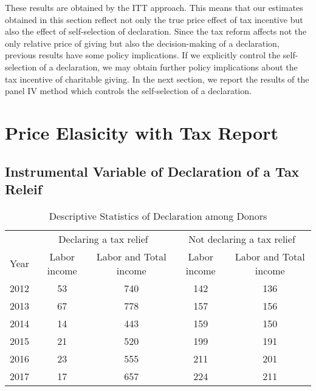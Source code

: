 \documentclass[
  11pt,
  a4paper,
]{article}
\begin{document}
These results are obtained by the ITT approach.
This means that our estimates obtained in this section reflect not only
the true price effect of tax incentive but also the effect of self-selection of declaration.
Since the tax reform affects not the only relative price of giving but also the decision-making of a declaration,
previous results have some policy implications.
If we explicitly control the self-selection of a declaration,
we may obtain further policy implications about the tax incentive of charitable giving.
In the next section, we report the results of the panel IV method which controls the self-selection of a declaration.

\hypertarget{price-elasicity-with-tax-report}{%
\section{Price Elasicity with Tax Report}\label{price-elasicity-with-tax-report}}

\hypertarget{instrumental-variable-of-declaration-of-a-tax-releif}{%
\subsection{Instrumental Variable of Declaration of a Tax Releif}\label{instrumental-variable-of-declaration-of-a-tax-releif}}

\begin{table}

\caption{\label{tab:SummaryDeduct}Descriptive Statistics of Declaration among Donors}
\centering
\begin{tabular}[t]{lcccc}
\toprule
\multicolumn{1}{c}{} & \multicolumn{2}{c}{Declaring a tax relief} & \multicolumn{2}{c}{Not declaring a tax relief} \\
\cmidrule(l{3pt}r{3pt}){2-3} \cmidrule(l{3pt}r{3pt}){4-5}
Year & Labor income & Labor and Total income & Labor income & Labor and Total income\\
\midrule
2012 & 53 & 740 & 142 & 136\\
2013 & 67 & 778 & 157 & 156\\
2014 & 14 & 443 & 159 & 150\\
2015 & 21 & 520 & 199 & 191\\
2016 & 23 & 555 & 211 & 201\\
2017 & 17 & 657 & 224 & 211\\
\bottomrule
\end{tabular}
\end{table}
\end{document}
